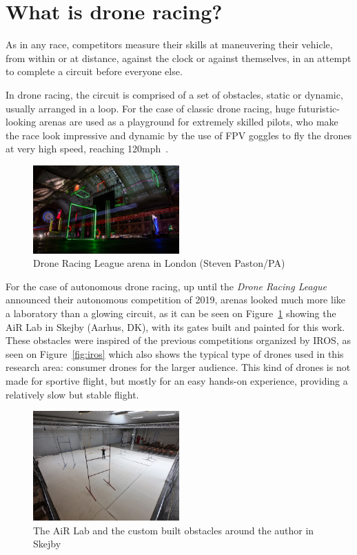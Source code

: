 \section{What is drone racing?}

As in any race, competitors measure their skills at maneuvering their vehicle,
from within or at distance, against the clock or against themselves, in an
attempt to complete a circuit before everyone else.

In drone racing, the circuit is comprised of a set of obstacles, static or
dynamic, usually arranged in a loop. For the case of classic drone racing, huge
futuristic-looking arenas are used as a playground for extremely skilled pilots,
who make the race look impressive and dynamic by the use of FPV goggles to fly
the drones at very high speed, reaching 120mph~\cite{DRL}.

\begin{figure}[h]
	\centering
	\includegraphics[width=0.5\textwidth]{figure/drl_arena.jpg}
	\caption{Drone Racing League arena in London (Steven
	Paston/PA)~\cite{DRLRecord}}
\end{figure}

For the case of autonomous drone racing, up until the \emph{Drone Racing
League} announced their autonomous competition of 2019, arenas looked much more
like a laboratory than a glowing circuit, as it can be seen on
Figure~\ref{fig:mygates} showing the AiR Lab in Skejby (Aarhus, DK), with its
gates built and painted for this work. These obstacles were inspired of the
previous competitions organized by IROS, as seen on Figure~\ref{fig:iros} which
also shows the typical type of drones used in this research area: consumer
drones for the larger audience. This kind of drones is not made for sportive
flight, but mostly for an easy hands-on experience, providing a relatively slow
but stable flight.

\begin{figure}[h]
	\centering
	\includegraphics[width=0.5\textwidth]{figure/tiny_me.jpg}
	\caption{The AiR Lab and the custom built obstacles around the author in Skejby}
	\label{fig:mygates}
\end{figure}

